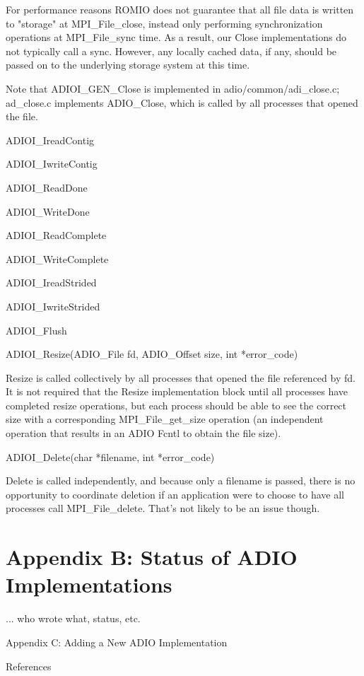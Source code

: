 For performance reasons ROMIO does not guarantee that all file data is written
to "storage" at MPI\_File\_close, instead only performing synchronization
operations at MPI\_File\_sync time.  As a result, our Close implementations do
not typically call a sync.  However, any locally cached data, if any, should
be passed on to the underlying storage system at this time.

Note that ADIOI\_GEN\_Close is implemented in adio/common/adi\_close.c;
ad\_close.c implements ADIO\_Close, which is called by all processes that opened
the file.

ADIOI\_IreadContig

ADIOI\_IwriteContig

ADIOI\_ReadDone

ADIOI\_WriteDone

ADIOI\_ReadComplete

ADIOI\_WriteComplete

ADIOI\_IreadStrided

ADIOI\_IwriteStrided

ADIOI\_Flush

ADIOI\_Resize(ADIO\_File fd, ADIO\_Offset size, int *error\_code)

Resize is called collectively by all processes that opened the file referenced
by fd.  It is not required that the Resize implementation block until all
processes have completed resize operations, but each process should be able to
see the correct size with a corresponding MPI\_File\_get\_size operation (an
independent operation that results in an ADIO Fcntl to obtain the file size).

ADIOI\_Delete(char *filename, int *error\_code)

Delete is called independently, and because only a filename is passed, there
is no opportunity to coordinate deletion if an application were to choose to
have all processes call MPI\_File\_delete.  That's not likely to be an issue
though.

\section*{Appendix B: Status of ADIO Implementations}

... who wrote what, status, etc.

Appendix C: Adding a New ADIO Implementation

References


